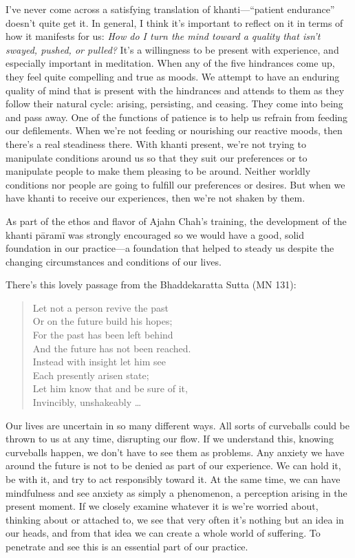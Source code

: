 I've never come across a satisfying translation of khanti---``patient 
endurance'' doesn't quite get it. In general, I think it's important to 
reflect on it in terms of how it manifests for us: \emph{How do I turn 
the mind toward a quality that isn't swayed, pushed, or pulled?} It's a 
willingness to be present with experience, and especially important in 
meditation. When any of the five hindrances come up, they feel quite 
compelling and true as moods. We attempt to have an enduring quality of 
mind that is present with the hindrances and attends to them as they 
follow their natural cycle: arising, persisting, and ceasing. They come 
into being and pass away. One of the functions of patience is to help 
us refrain from feeding our defilements. When we're not feeding or 
nourishing our reactive moods, then there's a real steadiness there. 
With khanti present, we're not trying to manipulate conditions around 
us so that they suit our preferences or to manipulate people to make 
them pleasing to be around. Neither worldly conditions nor people are 
going to fulfill our preferences or desires. But when we have khanti to 
receive our experiences, then we're not shaken by them.

As part of the ethos and flavor of Ajahn Chah's training, the 
development of the khanti pāramī was strongly encouraged so we would 
have a good, solid foundation in our practice---a foundation that 
helped to steady us despite the changing circumstances and conditions 
of our lives.


There's this lovely passage from the Bhaddekaratta Sutta (MN 131):

\begin{quote}
Let not a person revive the past\\
Or on the future build his hopes;\\
For the past has been left behind\\
And the future has not been reached.\\
Instead with insight let him see\\
Each presently arisen state;\\
Let him know that and be sure of it,\\
Invincibly, unshakeably \ldots{}

\end{quote}

Our lives are uncertain in so many different ways. All sorts of 
curveballs could be thrown to us at any time, disrupting our flow. If 
we understand this, knowing curveballs happen, we don't have to see 
them as problems. Any anxiety we have around the future is not to be 
denied as part of our experience. We can hold it, be with it, and try 
to act responsibly toward it. At the same time, we can have mindfulness 
and see anxiety as simply a phenomenon, a perception arising in the 
present moment. If we closely examine whatever it is we're worried 
about, thinking about or attached to, we see that very often it's 
nothing but an idea in our heads, and from that idea we can create a 
whole world of suffering. To penetrate and see this is an essential 
part of our practice.

